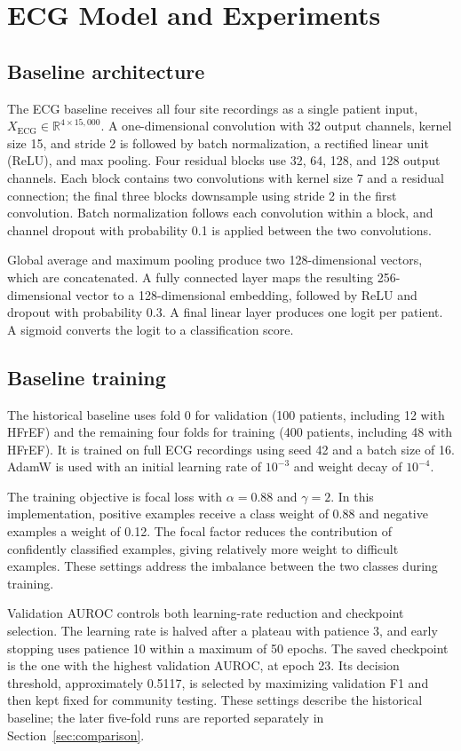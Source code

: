 \documentclass[11pt,a4paper]{article}
\begin{document}
\section{ECG Model and Experiments}
\label{sec:ecg}

\subsection{Baseline architecture}
The ECG baseline receives all four site recordings as a single patient
input, $X_{\mathrm{ECG}}\in\mathbb{R}^{4\times15{,}000}$. A one-dimensional
convolution with 32 output channels, kernel size 15, and stride 2 is followed
by batch normalization, a rectified linear unit (ReLU), and max pooling.
Four residual blocks use 32, 64, 128, and 128 output channels. Each block
contains two convolutions with kernel size 7 and a residual connection;
the final three blocks downsample using stride 2 in the first convolution.
Batch normalization follows each convolution within a block, and channel
dropout with probability 0.1 is applied between the two convolutions.

Global average and maximum pooling produce two 128-dimensional vectors,
which are concatenated. A fully connected layer maps the resulting
256-dimensional vector to a 128-dimensional embedding, followed by ReLU
and dropout with probability 0.3. A final linear layer produces one logit
per patient. A sigmoid converts the logit to a classification score.

\subsection{Baseline training}
The historical baseline uses fold 0 for validation (100 patients, including
12 with HFrEF) and the remaining four folds for training (400 patients,
including 48 with HFrEF). It is trained on full ECG recordings using seed
42 and a batch size of 16. AdamW is used with an initial learning rate of
$10^{-3}$ and weight decay of $10^{-4}$.

The training objective is focal loss with $\alpha=0.88$ and $\gamma=2$.
In this implementation, positive examples receive a class weight of 0.88
and negative examples a weight of 0.12. The focal factor reduces the
contribution of confidently classified examples, giving relatively more
weight to difficult examples. These settings address the imbalance
between the two classes during training.

Validation AUROC controls both learning-rate reduction and checkpoint
selection. The learning rate is halved after a plateau with patience 3,
and early stopping uses patience 10 within a maximum of 50 epochs. The
saved checkpoint is the one with the highest validation AUROC, at epoch
23. Its decision threshold, approximately 0.5117, is selected by maximizing
validation F1 and then kept fixed for community testing. These settings
describe the historical baseline; the later five-fold runs are reported
separately in Section~\ref{sec:comparison}.
\end{document}
